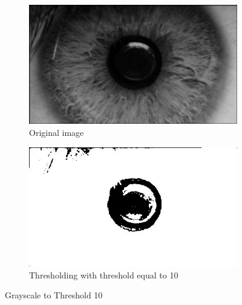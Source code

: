 \documentclass{article}
\begin{document}
%
%
\begin{figure}[H]
\centering

\begin{subfigure}{.5\textwidth}
  \centering
  \includegraphics[width=0.9\linewidth]{res/pupil/gray_n.jpg}
  \caption{Original image}
  \label{fig:original_img}
\end{subfigure}%
\begin{subfigure}{.5\textwidth}
  \centering
  \includegraphics[width=0.9\linewidth]{res/pupil/thresh_n10.jpg}
  \caption{Thresholding with threshold equal to 10}
  \label{fig:gray_img}
\end{subfigure}


\caption{Grayscale to Threshold 10}
\label{fig:result_pup_gray_tresh}
\end{figure}
\end{document}
